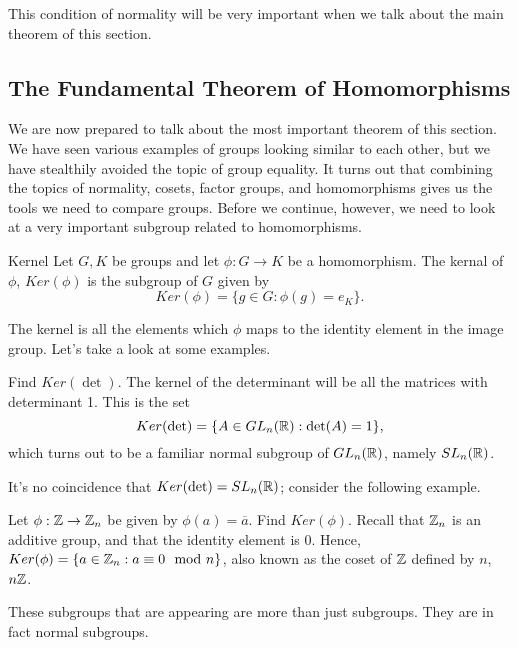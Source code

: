 This condition of normality will be very important when we talk about the main theorem of this section.

\subsection*{The Fundamental Theorem of Homomorphisms}

We are now prepared to talk about the most important theorem of this section.
We have seen various examples of groups looking similar to each other, but we have stealthily avoided the topic of group equality.
It turns out that combining the topics of normality, cosets, factor groups, and homomorphisms gives us the tools we need to compare groups.
Before we continue, however, we need to look at a very important subgroup related to homomorphisms.

\begin{definition}{Kernel}
    Let $G, K$ be groups and let $\phi: G\to K$ be a homomorphism.
    The kernal of $\phi$, $Ker(\phi)$ is the subgroup of $G$ given by
    \[
        Ker(\phi) = \{g\in G : \phi(g)=e_{K}\}.
    \]
\end{definition}

The kernel is all the elements which $\phi$ maps to the identity element in the image group.
Let's take a look at some examples.

\begin{example}{Find $Ker(\det)$.}
    The kernel of the determinant will be all the matrices with determinant 1.
    This is the set
    \[
        Ker(\det)=\{A\in GL_{n}(\mathbb{R}): \det(A)=1\},
    \]
    which turns out to be a familiar normal subgroup of $GL_{n}(\mathbb{R})$, namely $SL_{n}(\mathbb{R})$.
\end{example}

It's no coincidence that $Ker(\det)=SL_{n}(\mathbb{R})$; consider the following example.

\begin{example}{Let $\phi:\mathbb{Z}\to\mathbb{Z}_{n}$ be given by $\phi(a)=\overline{a}$. Find $Ker(\phi)$.}
    Recall that $\mathbb{Z}_{n}$ is an additive group, and that the identity element is 0.
    Hence, $Ker(\phi)=\{a\in\mathbb{Z}_{n}: a\equiv 0\mod n\}$, also known as the coset of $\mathbb{Z}$ defined by $n$, $n\mathbb{Z}$.
\end{example}

These subgroups that are appearing are more than just subgroups.
They are in fact normal subgroups.

